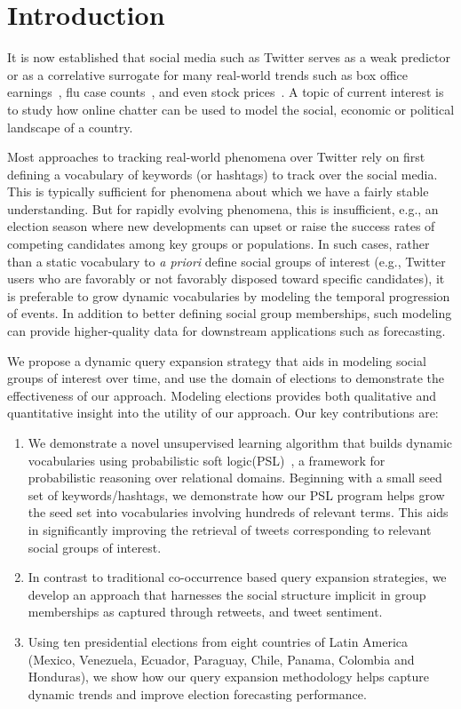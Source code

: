 \section{Introduction}
It is now established that social media such as Twitter serves as a weak
predictor or as a correlative surrogate for many real-world trends such
as %
box office earnings~\cite{asur2010predicting}, flu case counts~\cite{culotta2010towards}, and even stock 
prices~\cite{bollen2011twitter}. A topic of current interest is to study how
online chatter can be used to model
the social, economic or political landscape of a country.

Most approaches to tracking real-world phenomena over Twitter rely on first defining a vocabulary
of keywords (or hashtags) to track over the social media. This is typically sufficient for
phenomena about which we have a fairly stable understanding. But for rapidly evolving phenomena, this is insufficient,
e.g., an election season where new developments can upset or raise the success rates of competing candidates
among key groups or populations.
In such cases, rather than %
a static vocabulary to {\it a priori} define social groups
of interest (e.g., Twitter users who are favorably or not favorably disposed
toward specific candidates), it is preferable to grow dynamic vocabularies by modeling the temporal progression of
events. In addition to better defining social group memberships, such modeling can provide
higher-quality data for downstream applications such as forecasting.

We propose a dynamic query expansion strategy that aids in modeling social groups of interest over time, and
use the domain of elections to demonstrate the effectiveness of our approach. Modeling elections provides both
qualitative and quantitative insight into the utility of our approach.
Our key contributions are:
\begin{enumerate}
\item We demonstrate
a novel unsupervised learning algorithm that builds dynamic vocabularies using probabilistic soft logic(PSL)~\cite{kimmig2012short}, a framework for probabilistic reasoning over relational domains. Beginning with a small seed set of keywords/hashtags, we demonstrate how our PSL program helps grow the seed set into  vocabularies involving hundreds of relevant terms. This aids in significantly improving the retrieval of tweets corresponding to relevant
social groups of interest.
\item In contrast to traditional co-occurrence based query expansion strategies, we develop an approach that harnesses the social structure implicit in group memberships as captured through retweets, and tweet sentiment.
\item Using ten presidential elections from eight countries of Latin America (Mexico, Venezuela, Ecuador, Paraguay, Chile, Panama, Colombia and Honduras), we show how our query expansion methodology helps capture dynamic trends and improve election forecasting performance. 

\end{enumerate}

